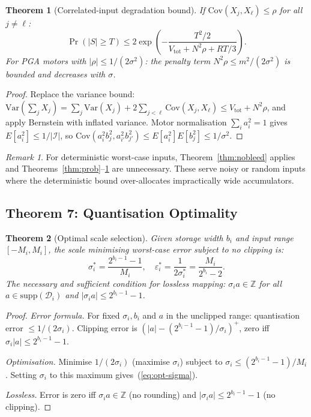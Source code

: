 \documentclass[11pt,a4paper]{article}
\theoremstyle{definition}
\theoremstyle{plain}
\newtheorem{theorem}{Theorem}[section]
\theoremstyle{remark}
\newtheorem{remark}{Remark}[section]
\newcommand{\Var}{\mathrm{Var}}
\newcommand{\Cov}{\mathrm{Cov}}
\begin{document}
\begin{theorem}[Correlated-input degradation bound]
\label{thm:corr}
If $\Cov(X_j,X_\ell)\le\rho$ for all $j\ne\ell$:
\begin{equation}\label{eq:bernstein-corr}
  \Pr(|S|\ge T)\le2\exp\!\left(-\frac{T^2/2}{V_{\mathrm{tot}}+N^2\rho+RT/3}\right).
\end{equation}
For PGA motors with $|\rho|\le1/(2\sigma^2)$:
the penalty term $N^2\rho\le m^2/(2\sigma^2)$ is bounded and decreases
with $\sigma$.
\end{theorem}
\begin{proof}
Replace the variance bound:
$\Var(\sum_j X_j)=\sum_j\Var(X_j)+2\sum_{j<\ell}\Cov(X_j,X_\ell)
\le V_{\mathrm{tot}}+N^2\rho$,
and apply Bernstein with inflated variance.
Motor normalisation $\sum_i a_i^2=1$ gives $E[a_i^2]\le1/|\mathcal{I}|$,
so $\Cov(a_i^2b_j^2,a_{i'}^2b_{j'}^2)\le E[a_i^2]E[b_j^2]\le1/\sigma^2$.
\end{proof}

\begin{remark}
For deterministic worst-case inputs, Theorem~\ref{thm:nobleed} applies
and Theorems~\ref{thm:prob}--\ref{thm:corr} are unnecessary.
These serve noisy or random inputs where the deterministic bound
over-allocates impractically wide accumulators.
\end{remark}

\subsection{Theorem 7: Quantisation Optimality}
\label{sec:quant}

\begin{theorem}[Optimal scale selection]
\label{thm:quant}
Given storage width $b_i$ and input range $[-M_i,M_i]$, the scale
minimising worst-case error subject to no clipping is:
\begin{equation}\label{eq:opt-sigma}
  \sigma_i^*=\frac{2^{b_i-1}-1}{M_i},
  \quad\varepsilon_i^*=\frac{1}{2\sigma_i^*}=\frac{M_i}{2^{b_i}-2}.
\end{equation}
The necessary and sufficient condition for lossless mapping:
$\sigma_i a\in\mathbb{Z}$ for all $a\in\mathrm{supp}(\mathcal{D}_i)$
and $|\sigma_i a|\le2^{b_i-1}-1$.
\end{theorem}

\begin{proof}
\emph{Error formula.}
For fixed $\sigma_i,b_i$ and $a$ in the unclipped range:
quantisation error $\le1/(2\sigma_i)$.
Clipping error is $(|a|-(2^{b_i-1}-1)/\sigma_i)^+$, zero iff
$\sigma_i|a|\le2^{b_i-1}-1$.

\emph{Optimisation.}
Minimise $1/(2\sigma_i)$ (maximise $\sigma_i$) subject to
$\sigma_i\le(2^{b_i-1}-1)/M_i$.
Setting $\sigma_i$ to this maximum gives~(\ref{eq:opt-sigma}).

\emph{Lossless.}
Error is zero iff $\sigma_i a\in\mathbb{Z}$ (no rounding) and
$|\sigma_i a|\le2^{b_i-1}-1$ (no clipping).
\end{proof}
\end{document}
